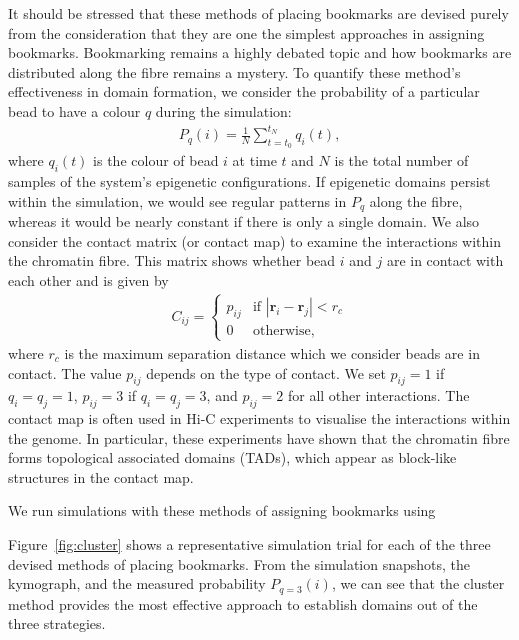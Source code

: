 \documentclass[12pt]{article}
\newcommand{\abs}[1]{\left|#1\right|}
\begin{document}
It should be stressed that these methods of placing bookmarks are devised purely from the consideration that they are one the simplest approaches in assigning bookmarks. Bookmarking remains a highly debated topic and how bookmarks are distributed along the fibre remains a mystery. To quantify these method's effectiveness in domain formation, we consider the probability of a particular bead to have a colour $q$ during the simulation:
\begin{eqnarray}
P_{q}(i) = \frac{1}{N} \sum_{t=t_0}^{t_N} q_i(t),
\end{eqnarray}
where $q_i(t)$ is the colour of bead $i$ at time $t$ and $N$ is the total number of samples of the system's epigenetic configurations. If epigenetic domains persist within the simulation, we would see regular patterns in $P_q$ along the fibre, whereas it would be nearly constant if there is only a single domain. We also consider the contact matrix (or contact map) to examine the interactions within the chromatin fibre. This matrix shows whether bead $i$ and $j$ are in contact with each other and is given by
\begin{eqnarray}
C_{ij} = \left\{ 
	\begin{array}{ll}
		p_{ij} & \textrm{if $\abs{\bm{r}_i - \bm{r}_j} < r_c$}\\
		0 & \textrm{otherwise},
	\end{array}\right.
\end{eqnarray}
where $r_c$ is the maximum separation distance which we consider beads are in contact. The value $p_{ij}$ depends on the type of contact. We set $p_{ij} = 1$ if $q_i = q_j = 1$, $p_{ij} = 3$ if $q_i = q_j = 3$, and $p_{ij} = 2$ for all other interactions. The contact map is often used in Hi-C experiments to visualise the interactions within the genome. In particular, these experiments have shown that the chromatin fibre forms topological associated domains (TADs), which appear as block-like structures in the contact map. 

We run simulations with these methods of assigning bookmarks using 

Figure~\ref{fig:cluster} shows a representative simulation trial for each of the three devised methods of placing bookmarks. From the simulation snapshots, the kymograph, and the measured probability $P_{q=3}(i)$, we can see that the cluster method provides the most effective approach to establish domains out of the three strategies. 



\end{document}
